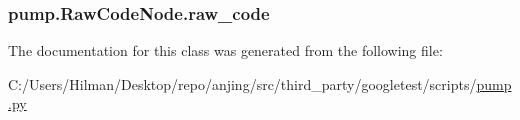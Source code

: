 \subsubsection[{raw\+\_\+code}]{\setlength{\rightskip}{0pt plus 5cm}pump.\+Raw\+Code\+Node.\+raw\+\_\+code}\label{classpump_1_1_raw_code_node_ab36224d959e0d8f803e9fac8e6a0baab}


The documentation for this class was generated from the following file\+:\begin{DoxyCompactItemize}
\item 
C\+:/\+Users/\+Hilman/\+Desktop/repo/anjing/src/third\+\_\+party/googletest/scripts/\hyperlink{pump_8py}{pump.\+py}\end{DoxyCompactItemize}
